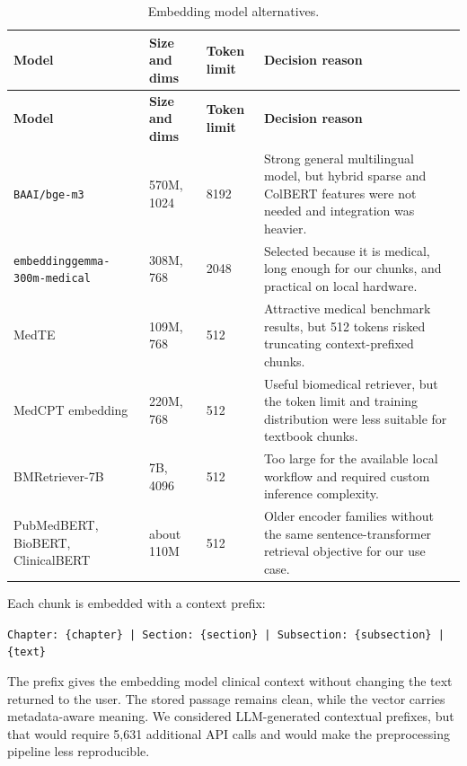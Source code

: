 \begin{longtable}{p{} p{} p{} p{}}
\caption{Embedding model alternatives.}
\label{tab:embedding_model_alternatives}\\
\toprule
\textbf{Model} & \textbf{Size and dims} & \textbf{Token limit} & \textbf{Decision reason}\\
\midrule
\endfirsthead
\toprule
\textbf{Model} & \textbf{Size and dims} & \textbf{Token limit} & \textbf{Decision reason}\\
\midrule
\endhead
\texttt{BAAI/bge-m3} & 570M, 1024 & 8192 & Strong general multilingual model, but hybrid sparse and ColBERT features were not needed and integration was heavier.\\
\texttt{embeddinggemma-300m-medical} & 308M, 768 & 2048 & Selected because it is medical, long enough for our chunks, and practical on local hardware.\\
MedTE & 109M, 768 & 512 & Attractive medical benchmark results, but 512 tokens risked truncating context-prefixed chunks.\\
MedCPT embedding & 220M, 768 & 512 & Useful biomedical retriever, but the token limit and training distribution were less suitable for textbook chunks.\\
BMRetriever-7B & 7B, 4096 & 512 & Too large for the available local workflow and required custom inference complexity.\\
PubMedBERT, BioBERT, ClinicalBERT & about 110M & 512 & Older encoder families without the same sentence-transformer retrieval objective for our use case.\\
\bottomrule
\end{longtable}

Each chunk is embedded with a context prefix:

\begin{center}
\texttt{Chapter: \{chapter\} | Section: \{section\} | Subsection: \{subsection\} | \{text\}}
\end{center}

The prefix gives the embedding model clinical context without changing the text returned to the user. The stored passage remains clean, while the vector carries metadata-aware meaning. We considered LLM-generated contextual prefixes, but that would require 5,631 additional API calls and would make the preprocessing pipeline less reproducible.


